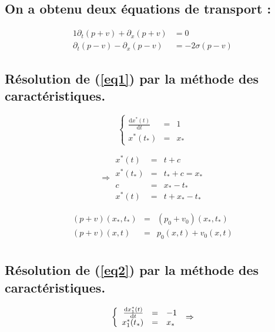 \documentclass[a4paper,11pt]{article}
\begin{document}
\subsection*{On a obtenu deux équations de transport :}
\begin{alignat}{1}
    \partial_{t}(p+v) + \partial_{x}(p+v) &= 0 \label{eq1} \\
    \partial_{t}(p-v) - \partial_{x}(p-v) &= -2\sigma(p-v) \label{eq2}
\end{alignat}

\subsection*{Résolution de (\ref{eq1}) par la méthode des caractéristiques.}

\begin{equation*}
\left\{
\begin{array}{rcl}
    \frac{\mathrm{d}x^{*}(t)}{\mathrm{d}t} &=& 1 \\
    x^{*}(t_{*}) &=& x_{*}
\end{array}
\right.
\end{equation*}

\begin{equation*}
\Rightarrow
\begin{array}{rcl}
x^{*}(t) &=& t +c \\
x^{*}(t_{*}) &=& t_{*}+c = x_{*}\\
c &=& x_{*}-t_{*} \\
x^{*}(t) &=& t + x_{*}-t_{*}
\end{array}
\end{equation*}

\begin{equation*}
\begin{array}{rcl}
    (p+v)(x_{*},t_{*}) &=& (p_{0}+v_{0})(x_{*},t_{*}) \\
    (p+v)(x,t) &=& p_{0}(x,t) + v_{0}(x,t)\\
\end{array}
\end{equation*}

\subsection*{Résolution de (\ref{eq2}) par la méthode des caractéristiques.}

\begin{equation*}
\left\{
\begin{array}{rcl}
    \frac{\mathrm{d}x_{1}^{*}(t)}{\mathrm{d}t} &=& -1 \\
    x_{1}^{*}(t_{*}) &=& x_{*}
\end{array}
\right. \\
\Rightarrow
\end{equation*}
\end{document}
